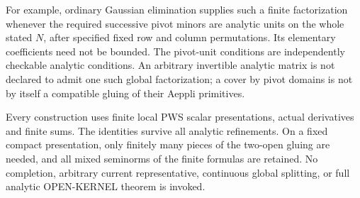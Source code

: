For example, ordinary Gaussian elimination supplies
such a finite factorization whenever the required
successive pivot minors are analytic units on the
whole stated $N$, after specified fixed row and
column permutations.  Its elementary coefficients
need not be bounded.  The pivot-unit conditions
are independently checkable analytic conditions.
An arbitrary invertible analytic matrix is not
declared to admit one such global factorization;
a cover by pivot domains is not by itself a
compatible gluing of their Aeppli primitives.

Every construction uses finite local PWS scalar
presentations, actual derivatives and finite sums.
The identities survive all analytic refinements.
On a fixed compact presentation, only finitely
many pieces of the two-open gluing are needed,
and all mixed seminorms of the finite formulas
are retained.  No completion, arbitrary current
representative, continuous global splitting, or
full analytic OPEN-KERNEL theorem is invoked.
